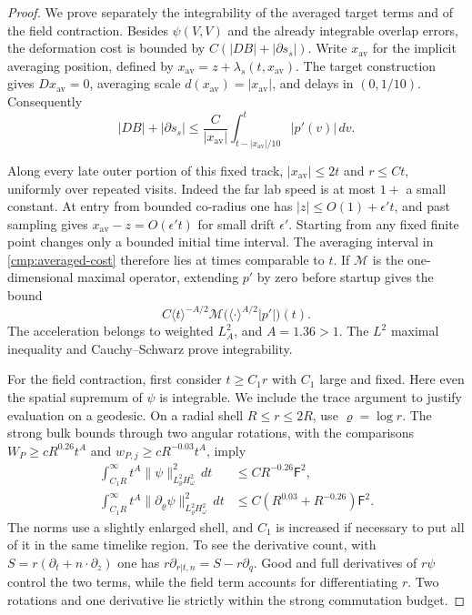 \begin{proof}
We prove separately the integrability of the averaged target terms and
of the field contraction. Besides $\psi(V,V)$ and the already
integrable overlap errors, the deformation cost is bounded by
$C(|DB|+|\partial s_s|)$. Write $x_{\mathrm{av}}$ for the implicit
averaging position, defined by
$x_{\mathrm{av}}=z+\lambda_s(t,x_{\mathrm{av}})$. The target
construction gives $Dx_{\mathrm{av}}=0$, averaging scale
$d(x_{\mathrm{av}})=|x_{\mathrm{av}}|$, and delays in $(0,1/10)$.
Consequently
\begin{equation}\label{cmp:averaged-cost}
 |DB|+|\partial s_s|
 \leq\frac{C}{|x_{\mathrm{av}}|}
       \int_{t-|x_{\mathrm{av}}|/10}^{t}|p'(v)|\,dv.
\end{equation}

Along every late outer portion of this fixed track,
$|x_{\mathrm{av}}|\leq2t$ and $r\leq Ct$, uniformly over repeated
visits. Indeed the far lab speed is at most $1+$ a small constant.
At entry from bounded co-radius one has
$|z|\leq O(1)+\epsilon't$, and past sampling gives
$x_{\mathrm{av}}-z=O(\epsilon't)$ for small drift $\epsilon'$.
Starting from any fixed finite point changes only a bounded initial
time interval. The averaging interval in \eqref{cmp:averaged-cost}
therefore lies at times comparable to $t$. If $\mathcal M$ is the
one-dimensional maximal operator, extending $p'$ by zero before startup
gives the bound
\[
 C\langle t\rangle^{-A/2}
       \mathcal M\bigl(\langle\cdot\rangle^{A/2}|p'|\bigr)(t).
\]
The acceleration belongs to weighted $L^2_A$, and $A=1.36>1$.
The $L^2$ maximal inequality and Cauchy--Schwarz prove integrability.

For the field contraction, first consider $t\geq C_1r$ with $C_1$
large and fixed. Here even the spatial supremum of $\psi$ is
integrable. We include the trace argument to justify evaluation on a
geodesic. On a radial shell $R\leq r\leq2R$, use
$\varrho=\log r$. The strong bulk bounds through two angular rotations,
with the comparisons $W_P\geq cR^{0.26}t^A$ and
$w_{P,j}\geq cR^{-0.03}t^A$, imply
\begin{align}
 \int_{C_1R}^{\infty}t^A
   \|\psi\|_{L^2_{\varrho}H^2_\omega}^2\,dt
       &\leq CR^{-0.26}\mathsf F^2,
       \label{cmp:trace-field}\\
 \int_{C_1R}^{\infty}t^A
   \|\partial_{\varrho}\psi\|_{L^2_{\varrho}H^2_\omega}^2\,dt
       &\leq C(R^{0.03}+R^{-0.26})\mathsf F^2.
       \label{cmp:trace-derivative}
\end{align}
The norms use a slightly enlarged shell, and $C_1$ is increased if
necessary to put all of it in the same timelike region. To see the
derivative count, with $S=r(\partial_t+n\cdot\partial_z)$ one has
$r\partial_{r|t,n}=S-r\partial_q$. Good and full derivatives of
$r\psi$ control the two terms, while the field term accounts for
differentiating $r$. Two rotations and one derivative lie strictly
within the strong commutation budget.


\end{proof}
